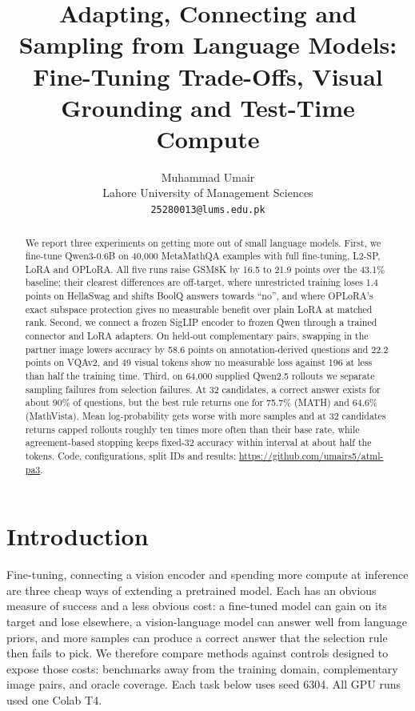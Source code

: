 \documentclass{article}
\title{Adapting, Connecting and Sampling from Language Models: \\
  Fine-Tuning Trade-Offs, Visual Grounding and Test-Time Compute}
\author{%
  Muhammad Umair \\
  Lahore University of Management Sciences \\
  \texttt{25280013@lums.edu.pk}
}
\begin{document}
\maketitle

\begin{abstract}
We report three experiments on getting more out of small language models. First, we fine-tune Qwen3-0.6B on 40,000 MetaMathQA examples with full fine-tuning, L2-SP, LoRA and OPLoRA. All five runs raise GSM8K by 16.5 to 21.9 points over the 43.1\% baseline; their clearest differences are off-target, where unrestricted training loses 1.4 points on HellaSwag and shifts BoolQ answers towards ``no'', and where OPLoRA's exact subspace protection gives no measurable benefit over plain LoRA at matched rank. Second, we connect a frozen SigLIP encoder to frozen Qwen through a trained connector and LoRA adapters. On held-out complementary pairs, swapping in the partner image lowers accuracy by 58.6 points on annotation-derived questions and 22.2 points on VQAv2, and 49 visual tokens show no measurable loss against 196 at less than half the training time. Third, on 64,000 supplied Qwen2.5 rollouts we separate sampling failures from selection failures. At 32 candidates, a correct answer exists for about 90\% of questions, but the best rule returns one for 75.7\% (MATH) and 64.6\% (MathVista). Mean log-probability gets worse with more samples and at 32 candidates returns capped rollouts roughly ten times more often than their base rate, while agreement-based stopping keeps fixed-32 accuracy within interval at about half the tokens. Code, configurations, split IDs and results: \url{https://github.com/umairs5/atml-pa3}.
\end{abstract}

\section{Introduction}
Fine-tuning, connecting a vision encoder and spending more compute at inference are three cheap ways of extending a pretrained model. Each has an obvious measure of success and a less obvious cost: a fine-tuned model can gain on its target and lose elsewhere, a vision-language model can answer well from language priors, and more samples can produce a correct answer that the selection rule then fails to pick. We therefore compare methods against controls designed to expose those costs: benchmarks away from the training domain, complementary image pairs, and oracle coverage. Each task below uses seed 6304. All GPU runs used one Colab T4.
\end{document}
